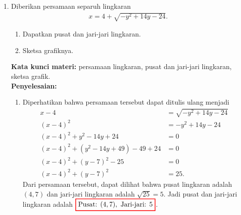 \documentclass[10pt,openany,a4paper]{article}
\theoremstyle{definition}
\theoremstyle{definition}
\theoremstyle{plain}
\newenvironment{jawab}[2][tes]{%
\par\noindent\textbf{Kata kunci materi:} #1.\\
\textbf{Penyelesaian:} #2%
}{}
\begin{document}
\begin{enumerate}
\begin{jawab}[domain dan range fungsi, fungsi invers]
{\begin{enumerate}
            Selanjutnya, domain dari fungsi invers adalah range dari fungsi asli, yaitu $\colorlet{oldcolor}{.}
        \color{blue}
        \setlength{\fboxrule}{1pt} \boxed{\color{oldcolor}D(f^{-1}) = R(f) = [0, \infty)}\color{oldcolor}$, serta range dari fungsi invers adalah domain dari fungsi asli, yaitu $\colorlet{oldcolor}{.}
        \color{blue}
        \setlength{\fboxrule}{1pt} \boxed{\color{oldcolor}R(f^{-1}) = D(f) = [4, \infty)}\color{oldcolor}$. Jadi fungsi inversnya adalah
        \begin{align*}
            \colorlet{oldcolor}{.}
        \color{red}
        \setlength{\fboxrule}{1pt} \boxed{\color{oldcolor}f^{-1}(x) = x^2 + 4,\quad x\geq 0}\color{oldcolor}.
        \end{align*}
        \end{enumerate}
    }
    \end{jawab}
    \item Diberikan persamaan separuh lingkaran
    \begin{align*}
       x=4+\sqrt{-y^2+14y-24}.
    \end{align*}
    \begin{enumerate}
        \item Dapatkan pusat dan jari-jari lingkaran.
        \item Sketsa grafiknya.
    \end{enumerate}
    \begin{jawab}[persamaan lingkaran, pusat dan jari-jari lingkaran, sketsa grafik]{
        \begin{enumerate}
            \item Diperhatikan bahwa persamaan tersebut dapat ditulis ulang menjadi
            \begin{align*}
                x-4 &= \sqrt{-y^2+14y-24}\\
                (x-4)^2 &= -y^2+14y-24\\
                (x-4)^2 + y^2 - 14y + 24 &= 0\\
                (x-4)^2 + (y^2 - 14y + 49) - 49 + 24 &= 0\\
                (x-4)^2 + (y-7)^2 - 25 &= 0\\
                (x-4)^2 + (y-7)^2 &= 25.
            \end{align*}
            Dari persamaan tersebut, dapat dilihat bahwa pusat lingkaran adalah $(4,7)$ dan jari-jari lingkaran adalah $\sqrt{25} = 5$. Jadi pusat dan jari-jari lingkaran adalah $\colorlet{oldcolor}{.}
        \color{red}
        \setlength{\fboxrule}{1pt} \boxed{\color{oldcolor}\text{Pusat: }(4,7),~\text{Jari-jari: }5}\color{oldcolor}$.

\end{enumerate}}
\end{jawab}
\end{enumerate}
\end{document}

